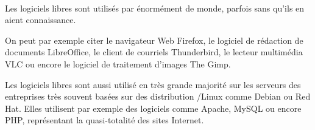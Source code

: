 \begin{minipage}{0.1\textwidth}
\begin{center}
 \\\vspace{1mm}
\vspace{1mm}
\vspace{1mm}
\vspace{1mm}
\end{center}
\end{minipage}
\begin{minipage}{0.75\textwidth}
\begin{multicols}{2}
Les logiciels libres sont utilisés par énormément de monde, parfois sans qu’ils en aient connaissance. 

On peut par exemple citer le navigateur Web \textcolor{Cdl}{Firefox}, le logiciel de rédaction de documents \textcolor{Cdl}{LibreOffice}, le client de courriels \textcolor{Cdl}{Thunderbird}, le lecteur multimédia \textcolor{Cdl}{VLC} ou encore le logiciel de traitement d’images \textcolor{Cdl}{The Gimp}.

Les logiciels libres sont aussi utilisé en très grande majorité sur les serveurs des entreprises très souvent basées sur des distribution /Linux comme \textcolor{Cdl}{Debian} ou \textcolor{Cdl}{Red\,Hat}. Elles utilisent par exemple des logiciels comme \textcolor{Cdl}{Apache}, \textcolor{Cdl}{MySQL} ou encore \textcolor{Cdl}{PHP}, représentant la quasi-totalité des sites Internet.
\end{multicols}
\end{minipage}
\begin{minipage}{0.15\textwidth}
\begin{center}
\vspace{1mm}
\vspace{1mm}
\vspace{1mm}
\vspace{1mm}
\end{center}
\end{minipage}
\vspace*{\baselineskip}
